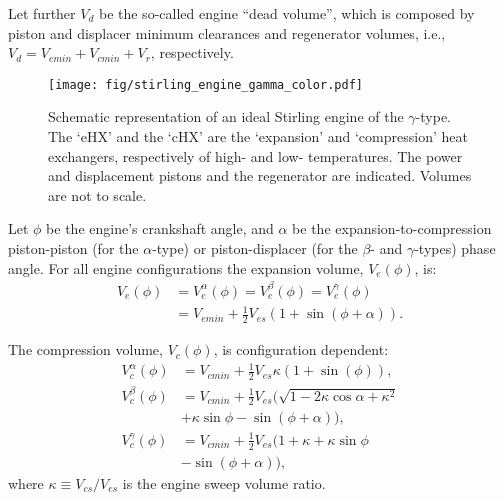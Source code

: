     Let further $V_d$ be the so-called engine ``dead volume'', which is composed by  piston  and
    displacer minimum clearances and regenerator volumes, i.e., $V_d =  V_{emin}  +  V_{cmin}  +
    V_r$, respectively.

    \begin{figure}[ht]
        \centering
        \texttt{[image: fig/stirling\_engine\_gamma\_color.pdf]}
        \caption{Schematic representation of an ideal Stirling engine of the $\gamma$-type.  The
            `eHX'  and  the  `cHX'  are  the  `expansion'  and  `compression'  heat  exchangers,
            respectively of high- and low- temperatures. The power and displacement pistons  and
            the regenerator are indicated. Volumes are not to scale.}
        \label{fig:gamma}
    \end{figure}

    Let $\phi$ be the engine's crankshaft angle, and $\alpha$  be  the  expansion-to-compression
    piston-piston  (for  the  $\alpha$-type)  or  piston-displacer   (for   the   $\beta$-   and
    $\gamma$-types)  phase  angle.  For  all  engine  configurations   the   expansion   volume,
    $V_e(\phi)$, is:
    \begin{align}
        \label{eq:Ve}
        V_e(\phi) &= V^{\alpha}_e(\phi) = V^{\beta}_e(\phi) = V^{\gamma}_e(\phi) \nonumber\\
                  &= V_{emin} + \frac{1}{2} V_{es}(1 + \sin(\phi + \alpha)).
    \end{align}

    The compression volume, $V_c(\phi)$, is configuration dependent:
    \begin{align}
        \label{eq:Vca}
        V^{\alpha}_c(\phi) &= V_{cmin} + \frac{1}{2} V_{es} \kappa (1 + \sin(\phi)), \\
        \label{eq:Vcb}
        V^{\beta}_c(\phi)  &= V_{cmin} +
            \frac{1}{2} V_{es} (\sqrt{1 - 2\kappa\cos\alpha + \kappa^2} \nonumber\\
                           &+ \kappa\sin\phi - \sin(\phi + \alpha)), \\
        \label{eq:Vcg}
        V^{\gamma}_c(\phi) &= V_{cmin} + \frac{1}{2} V_{es}
            (1 + \kappa + \kappa\sin\phi \nonumber\\
                           &- \sin(\phi + \alpha)),
    \end{align}
    \noindent where $\kappa \equiv V_{cs}/V_{es}$ is the engine sweep volume ratio.

